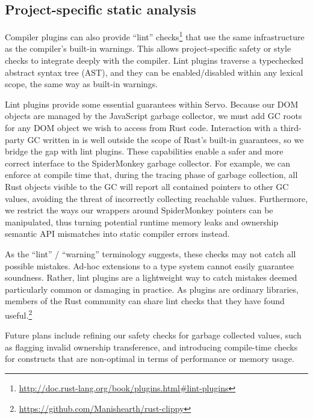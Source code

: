 \subsection{Project-specific static analysis}

Compiler plugins can also provide ``lint'' checks\footnote{\url{http://doc.rust-lang.org/book/plugins.html#lint-plugins}} that use the same infrastructure as the compiler's built-in warnings. This allows project-specific safety or style checks to integrate deeply with the compiler. Lint plugins traverse a typechecked abstract syntax tree (AST), and they can be enabled/disabled within any lexical scope, the same way as built-in warnings.

Lint plugins provide some essential guarantees within Servo. Because our DOM objects are managed by the JavaScript garbage collector, we must add GC roots for any DOM object we wish to access from Rust code. Interaction with a third-party GC written in \Cplusplus{} is well outside the scope of Rust's built-in guarantees, so we bridge the gap with lint plugins. These capabilities enable a safer and more correct interface to the SpiderMonkey garbage collector. For example, we can enforce at compile time that, during the tracing phase of garbage collection, all Rust objects visible to the GC will report all contained pointers to other GC values, avoiding the threat of incorrectly collecting reachable values. Furthermore, we restrict the ways our wrappers around SpiderMonkey pointers can be manipulated, thus turning potential runtime memory leaks and ownership semantic API mismatches into static compiler errors instead.

As the ``lint'' / ``warning'' terminology suggests, these checks may not catch all possible mistakes. Ad-hoc extensions to a type system cannot easily guarantee soundness. Rather, lint plugins are a lightweight way to catch mistakes deemed particularly common or damaging in practice. As plugins are ordinary libraries, members of the Rust community can share lint checks that they have found useful.\footnote{\url{https://github.com/Manishearth/rust-clippy}}

Future plans include refining our safety checks for garbage collected values, such as flagging invalid ownership
transference, and introducing compile-time checks for constructs that are non-optimal in terms of performance or
memory usage.
